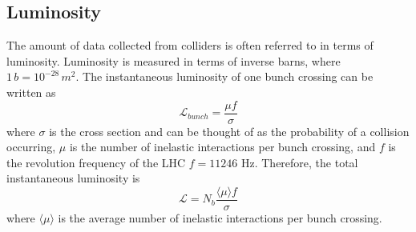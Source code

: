 	\subsection{Luminosity}\label{ssec:lumi}
		The amount of data collected from colliders is often referred to in terms of luminosity. Luminosity is measured in terms of inverse barns, where $1 \, b = 10^{-28} \, m^2$. The instantaneous luminosity of one bunch crossing can be written as 
		\begin{equation}\label{eqn:bunch-lumi}
		\mathcal{L}_{bunch} = \frac{ \mu  f }{\sigma}
		\end{equation}
		where $\sigma$ is the cross section and can be thought of as the probability of a collision occurring, $\mu$ is the number of inelastic interactions per bunch crossing, and $f$ is the revolution frequency of the LHC $f=11246$ Hz. Therefore, the total instantaneous luminosity is 
		\begin{equation}\label{eqn:tot-inst-lumi}
		\mathcal{L} = N_b \frac{ \langle \mu \rangle f}{\sigma}
		\end{equation}
		where $\langle \mu \rangle$ is the average number of inelastic interactions per bunch crossing. 

